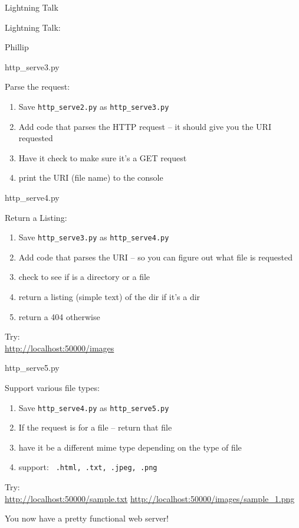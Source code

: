 \documentclass{beamer}
\begin{document}
\begin{frame}{Lightning Talk}

{\centering

\vfill
{\LARGE Lightning Talk:  }

\vfill
{\Huge Phillip}

\vfill
}
\end{frame}


\begin{frame}[fragile]{http\_serve3.py}

{\Large Parse the request:}
\begin{enumerate}
  \item Save \verb|http_serve2.py|  as \verb|http_serve3.py|
  \item Add code that parses the HTTP request -- it should give you the URI requested
  \item Have it check to make sure it's a GET request
  \item print the URI (file name) to the console
\end{enumerate}

\end{frame}

\begin{frame}[fragile]{http\_serve4.py}

{\Large Return a Listing:}
\begin{enumerate}
  \item Save \verb|http_serve3.py|  as \verb|http_serve4.py|
  \item Add code that parses the URI -- so you can figure out what file is requested
  \item check to see if is a directory or a file
  \item return a listing (simple text) of the dir if it's a dir
  \item return a 404 otherwise
\end{enumerate}

\vfill
Try: \\
\url{http://localhost:50000/images}
\end{frame}

\begin{frame}[fragile]{http\_serve5.py}

{\Large Support various file types:}
\begin{enumerate}
  \item Save \verb|http_serve4.py|  as \verb|http_serve5.py|
  \item If the request is for a file -- return that file
  \item have it be a different mime type depending on the type of file
  \item support: \verb| .html, .txt, .jpeg, .png|
\end{enumerate}

\vfill
Try: \\
\url{http://localhost:50000/sample.txt}
\url{http://localhost:50000/images/sample_1.png}

\vfill
{\Large You now have a pretty functional web server!} 
\end{frame}
\end{document}
